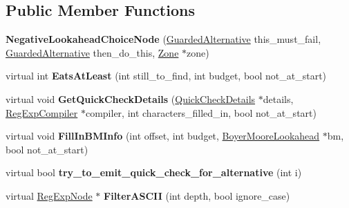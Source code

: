 \subsection*{Public Member Functions}
\begin{DoxyCompactItemize}
\item 
\hypertarget{classv8_1_1internal_1_1_negative_lookahead_choice_node_a16b13281b2934e09b7e2ca0c20971243}{}{\bfseries Negative\+Lookahead\+Choice\+Node} (\hyperlink{classv8_1_1internal_1_1_guarded_alternative}{Guarded\+Alternative} this\+\_\+must\+\_\+fail, \hyperlink{classv8_1_1internal_1_1_guarded_alternative}{Guarded\+Alternative} then\+\_\+do\+\_\+this, \hyperlink{classv8_1_1internal_1_1_zone}{Zone} $\ast$zone)\label{classv8_1_1internal_1_1_negative_lookahead_choice_node_a16b13281b2934e09b7e2ca0c20971243}

\item 
\hypertarget{classv8_1_1internal_1_1_negative_lookahead_choice_node_a3584de36b86263d593549121709fdff7}{}virtual int {\bfseries Eats\+At\+Least} (int still\+\_\+to\+\_\+find, int budget, bool not\+\_\+at\+\_\+start)\label{classv8_1_1internal_1_1_negative_lookahead_choice_node_a3584de36b86263d593549121709fdff7}

\item 
\hypertarget{classv8_1_1internal_1_1_negative_lookahead_choice_node_a5c17dcf65d971b90f17cf63c4b37ba62}{}virtual void {\bfseries Get\+Quick\+Check\+Details} (\hyperlink{classv8_1_1internal_1_1_quick_check_details}{Quick\+Check\+Details} $\ast$details, \hyperlink{classv8_1_1internal_1_1_reg_exp_compiler}{Reg\+Exp\+Compiler} $\ast$compiler, int characters\+\_\+filled\+\_\+in, bool not\+\_\+at\+\_\+start)\label{classv8_1_1internal_1_1_negative_lookahead_choice_node_a5c17dcf65d971b90f17cf63c4b37ba62}

\item 
\hypertarget{classv8_1_1internal_1_1_negative_lookahead_choice_node_af9877602fd6a0bb8770874a0c7b5bf83}{}virtual void {\bfseries Fill\+In\+B\+M\+Info} (int offset, int budget, \hyperlink{classv8_1_1internal_1_1_boyer_moore_lookahead}{Boyer\+Moore\+Lookahead} $\ast$bm, bool not\+\_\+at\+\_\+start)\label{classv8_1_1internal_1_1_negative_lookahead_choice_node_af9877602fd6a0bb8770874a0c7b5bf83}

\item 
\hypertarget{classv8_1_1internal_1_1_negative_lookahead_choice_node_a903e1823b1e6adf86a24d8335a5e6870}{}virtual bool {\bfseries try\+\_\+to\+\_\+emit\+\_\+quick\+\_\+check\+\_\+for\+\_\+alternative} (int i)\label{classv8_1_1internal_1_1_negative_lookahead_choice_node_a903e1823b1e6adf86a24d8335a5e6870}

\item 
\hypertarget{classv8_1_1internal_1_1_negative_lookahead_choice_node_a470bc98ec0a84aae64a75b65f6b03f37}{}virtual \hyperlink{classv8_1_1internal_1_1_reg_exp_node}{Reg\+Exp\+Node} $\ast$ {\bfseries Filter\+A\+S\+C\+I\+I} (int depth, bool ignore\+\_\+case)\label{classv8_1_1internal_1_1_negative_lookahead_choice_node_a470bc98ec0a84aae64a75b65f6b03f37}

\end{DoxyCompactItemize}
